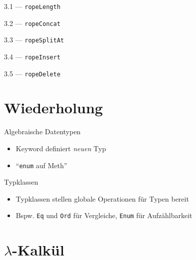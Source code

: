 \documentclass{beamer}
\newcommand{\code}[1]{
	\begin{mdframed}
		
	\end{mdframed}
}
\begin{document}
\begin{frame}{3.1 --- \texttt{ropeLength}}
	\code{demos/RopeLength.hs}
\end{frame}

\begin{frame}{3.2 --- \texttt{ropeConcat}}
	\code{demos/RopeConcat.hs}
\end{frame}

\begin{frame}{3.3 --- \texttt{ropeSplitAt}}
	\code{demos/RopeSplitAt.hs}
\end{frame}

\begin{frame}{3.4 --- \texttt{ropeInsert}}
	\code{demos/RopeInsert.hs}
\end{frame}

\begin{frame}{3.5 --- \texttt{ropeDelete}}
	\code{demos/RopeDelete.hs}
\end{frame}

\section{Wiederholung}

\begin{frame}{Algebraische Datentypen}
	\code{demos/DataExamples.hs}

	\begin{itemize}
		\item Keyword  definiert \emph{neuen} Typ
		\item \enquote{\texttt{enum} auf Meth}
	\end{itemize}
\end{frame}

\begin{frame}{Typklassen}
	\code{demos/TypeClassExamples.hs}

	\begin{itemize}
		\item Typklassen stellen globale Operationen für Typen bereit
		\item Bspw. \texttt{Eq} und \texttt{Ord} für Vergleiche, \texttt{Enum} für Aufzählbarkeit
	\end{itemize}
\end{frame}

\section{$\lambda$-Kalkül}
\end{document}
